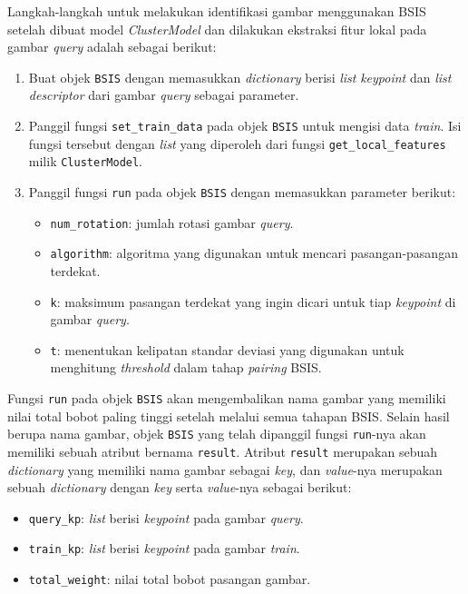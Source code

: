 Langkah-langkah untuk melakukan identifikasi gambar menggunakan BSIS setelah dibuat model \textit{ClusterModel} dan dilakukan ekstraksi fitur lokal pada gambar \textit{query} adalah sebagai berikut:
\begin{enumerate}
	\item Buat objek \texttt{BSIS} dengan memasukkan \textit{dictionary} berisi \textit{list} \textit{keypoint} dan \textit{list} \textit{descriptor} dari gambar \textit{query} sebagai parameter.
	\item Panggil fungsi \texttt{set\_train\_data} pada objek \texttt{BSIS} untuk mengisi data \textit{train}. Isi fungsi tersebut dengan \textit{list} yang diperoleh dari fungsi \texttt{get\_local\_features} milik \texttt{ClusterModel}.
	\item Panggil fungsi \texttt{run} pada objek \texttt{BSIS} dengan memasukkan parameter berikut:
	\begin{itemize}
		\item \texttt{num\_rotation}: jumlah rotasi gambar \textit{query}.
		\item \texttt{algorithm}: algoritma yang digunakan untuk mencari pasangan-pasangan terdekat.
		\item \texttt{k}: maksimum pasangan terdekat yang ingin dicari untuk tiap \textit{keypoint} di gambar \textit{query}.
		\item \texttt{t}: menentukan kelipatan standar deviasi yang digunakan untuk menghitung \textit{threshold} dalam tahap \textit{pairing} BSIS.
	\end{itemize}
\end{enumerate} 
Fungsi \texttt{run} pada objek \texttt{BSIS} akan mengembalikan nama gambar yang memiliki nilai total bobot paling tinggi setelah melalui semua tahapan BSIS. Selain hasil berupa nama gambar, objek \texttt{BSIS} yang telah dipanggil fungsi \texttt{run}-nya akan memiliki sebuah atribut bernama \texttt{result}. Atribut \texttt{result} merupakan sebuah \textit{dictionary} yang memiliki nama gambar sebagai \textit{key}, dan \textit{value}-nya merupakan sebuah \textit{dictionary} dengan \textit{key} serta \textit{value}-nya sebagai berikut:
\begin{itemize}
	\item \texttt{query\_kp}: \textit{list} berisi \textit{keypoint} pada gambar \textit{query}.
	\item \texttt{train\_kp}: \textit{list} berisi \textit{keypoint} pada gambar \textit{train}.
	\item \texttt{total\_weight}: nilai total bobot pasangan gambar.
\end{itemize}  

